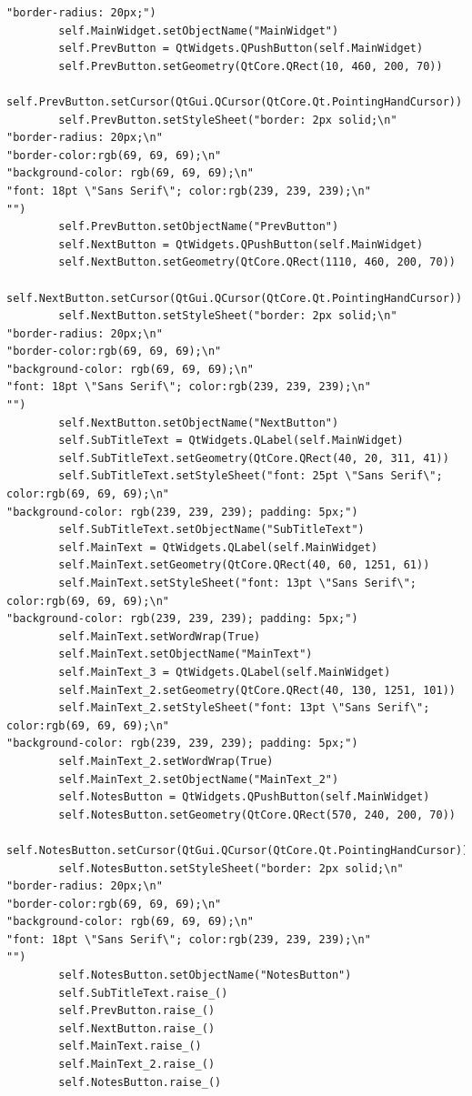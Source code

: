 \documentclass{article}
\begin{document}
\begin{lstlisting}
"border-radius: 20px;")
        self.MainWidget.setObjectName("MainWidget")
        self.PrevButton = QtWidgets.QPushButton(self.MainWidget)
        self.PrevButton.setGeometry(QtCore.QRect(10, 460, 200, 70))
        self.PrevButton.setCursor(QtGui.QCursor(QtCore.Qt.PointingHandCursor))
        self.PrevButton.setStyleSheet("border: 2px solid;\n"
"border-radius: 20px;\n"
"border-color:rgb(69, 69, 69);\n"
"background-color: rgb(69, 69, 69);\n"
"font: 18pt \"Sans Serif\"; color:rgb(239, 239, 239);\n"
"")
        self.PrevButton.setObjectName("PrevButton")
        self.NextButton = QtWidgets.QPushButton(self.MainWidget)
        self.NextButton.setGeometry(QtCore.QRect(1110, 460, 200, 70))
        self.NextButton.setCursor(QtGui.QCursor(QtCore.Qt.PointingHandCursor))
        self.NextButton.setStyleSheet("border: 2px solid;\n"
"border-radius: 20px;\n"
"border-color:rgb(69, 69, 69);\n"
"background-color: rgb(69, 69, 69);\n"
"font: 18pt \"Sans Serif\"; color:rgb(239, 239, 239);\n"
"")
        self.NextButton.setObjectName("NextButton")
        self.SubTitleText = QtWidgets.QLabel(self.MainWidget)
        self.SubTitleText.setGeometry(QtCore.QRect(40, 20, 311, 41))
        self.SubTitleText.setStyleSheet("font: 25pt \"Sans Serif\"; color:rgb(69, 69, 69);\n"
"background-color: rgb(239, 239, 239); padding: 5px;")
        self.SubTitleText.setObjectName("SubTitleText")
        self.MainText = QtWidgets.QLabel(self.MainWidget)
        self.MainText.setGeometry(QtCore.QRect(40, 60, 1251, 61))
        self.MainText.setStyleSheet("font: 13pt \"Sans Serif\"; color:rgb(69, 69, 69);\n"
"background-color: rgb(239, 239, 239); padding: 5px;")
        self.MainText.setWordWrap(True)
        self.MainText.setObjectName("MainText")
        self.MainText_3 = QtWidgets.QLabel(self.MainWidget)
        self.MainText_2.setGeometry(QtCore.QRect(40, 130, 1251, 101))
        self.MainText_2.setStyleSheet("font: 13pt \"Sans Serif\"; color:rgb(69, 69, 69);\n"
"background-color: rgb(239, 239, 239); padding: 5px;")
        self.MainText_2.setWordWrap(True)
        self.MainText_2.setObjectName("MainText_2")
        self.NotesButton = QtWidgets.QPushButton(self.MainWidget)
        self.NotesButton.setGeometry(QtCore.QRect(570, 240, 200, 70))
        self.NotesButton.setCursor(QtGui.QCursor(QtCore.Qt.PointingHandCursor))
        self.NotesButton.setStyleSheet("border: 2px solid;\n"
"border-radius: 20px;\n"
"border-color:rgb(69, 69, 69);\n"
"background-color: rgb(69, 69, 69);\n"
"font: 18pt \"Sans Serif\"; color:rgb(239, 239, 239);\n"
"")
        self.NotesButton.setObjectName("NotesButton")
        self.SubTitleText.raise_()
        self.PrevButton.raise_()
        self.NextButton.raise_()
        self.MainText.raise_()
        self.MainText_2.raise_()
        self.NotesButton.raise_()


\end{lstlisting}
\end{document}
